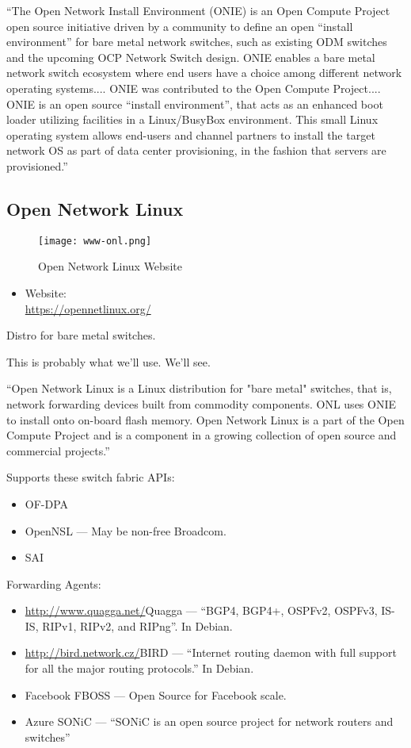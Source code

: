 ``The Open Network Install Environment (ONIE) is an Open Compute Project open source initiative driven by a community to define an open ``install environment'' for bare metal network switches, such as existing ODM switches and the upcoming OCP Network Switch design. ONIE enables a bare metal network switch ecosystem where end users have a choice among different network operating systems.... ONIE was contributed to the Open Compute Project.... ONIE is an open source ``install environment'', that acts as an enhanced boot loader utilizing facilities in a Linux/BusyBox environment. This small Linux operating system allows end-users and channel partners to install the target network OS as part of data center provisioning, in the fashion that servers are provisioned.''


\subsection{Open Network Linux}
\begin{figure}[h!]
\texttt{[image: www-onl.png]}
 \caption{Open Network Linux Website}
 \label{fig:www-onl}
\end{figure}


\begin{itemize}
 \item Website: \\ \url{https://opennetlinux.org/}
\end{itemize}


Distro for bare metal switches.


This is probably what we'll use. We'll see.


``Open Network Linux is a Linux distribution for "bare metal" switches, that is, network forwarding devices built from commodity components. ONL uses ONIE to install onto on-board flash memory. Open Network Linux is a part of the Open Compute Project and is a component in a growing collection of open source and commercial projects.''


Supports these switch fabric APIs:
\begin{itemize}
 \item OF-DPA
 \item OpenNSL --- May be non-free Broadcom.
 \item SAI
\end{itemize}


Forwarding Agents:
\begin{itemize}
 \item \url{http://www.quagga.net/}{Quagga} ---
       ``BGP4, BGP4+, OSPFv2, OSPFv3, IS-IS, RIPv1, RIPv2, and RIPng''. In Debian.
 \item \url{http://bird.network.cz/}{BIRD} ---
       ``Internet routing daemon with full support for all the major routing protocols.'' In Debian.
 \item Facebook FBOSS --- Open Source for Facebook scale.
 \item Azure SONiC --- ``SONiC is an open source project for network routers and switches''
\end{itemize}


